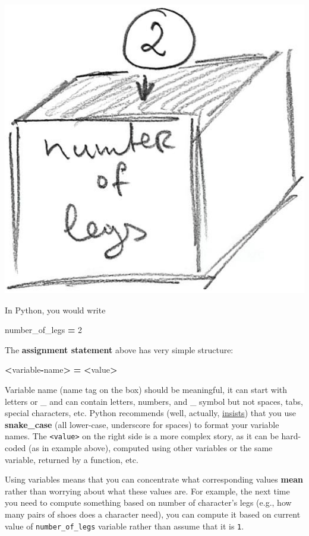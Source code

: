 \documentclass[
]{book}
\newenvironment{Shaded}{\begin{snugshade}}{\end{snugshade}}
\newcommand{\DecValTok}[1]{\textcolor[rgb]{0.00,0.00,0.81}{#1}}
\newcommand{\NormalTok}[1]{#1}
\newcommand{\OperatorTok}[1]{\textcolor[rgb]{0.81,0.36,0.00}{\textbf{#1}}}
\begin{document}
\begin{center}\includegraphics[width=0.5\linewidth]{images/variable-as-box} \end{center}

In Python, you would write

\begin{Shaded}
\begin{Highlighting}[]
\NormalTok{number\_of\_legs }\OperatorTok{=} \DecValTok{2}
\end{Highlighting}
\end{Shaded}

The \textbf{assignment statement} above has very simple structure:

\begin{Shaded}
\begin{Highlighting}[]
\OperatorTok{\textless{}}\NormalTok{variable}\OperatorTok{{-}}\NormalTok{name}\OperatorTok{\textgreater{}} \OperatorTok{=} \OperatorTok{\textless{}}\NormalTok{value}\OperatorTok{\textgreater{}}
\end{Highlighting}
\end{Shaded}

Variable name (name tag on the box) should be meaningful, it can start with letters or \_ and can contain letters, numbers, and \_ symbol but not spaces, tabs, special characters, etc. Python recommends (well, actually, \href{https://www.python.org/dev/peps/pep-0008/}{insists}) that you use \textbf{snake\_case} (all lower-case, underscore for spaces) to format your variable names. The \texttt{\textless{}value\textgreater{}} on the right side is a more complex story, as it can be hard-coded (as in example above), computed using other variables or the same variable, returned by a function, etc.

Using variables means that you can concentrate what corresponding values \textbf{mean} rather than worrying about what these values are. For example, the next time you need to compute something based on number of character's legs (e.g., how many pairs of shoes does a character need), you can compute it based on current value of \texttt{number\_of\_legs} variable rather than assume that it is \texttt{1}.
\end{document}
